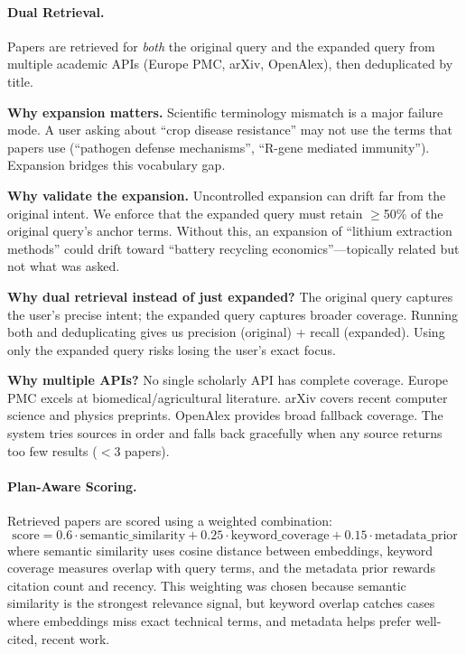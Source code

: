 \documentclass[11pt]{article}
\begin{document}
\paragraph{Dual Retrieval.} Papers are retrieved for \emph{both} the original query and the expanded query from multiple academic APIs (Europe PMC, arXiv, OpenAlex), then deduplicated by title.

\textbf{Why expansion matters.} Scientific terminology mismatch is a major failure mode. A user asking about ``crop disease resistance'' may not use the terms that papers use (``pathogen defense mechanisms'', ``R-gene mediated immunity''). Expansion bridges this vocabulary gap.

\textbf{Why validate the expansion.} Uncontrolled expansion can drift far from the original intent. We enforce that the expanded query must retain $\geq$50\% of the original query's anchor terms. Without this, an expansion of ``lithium extraction methods'' could drift toward ``battery recycling economics''---topically related but not what was asked.

\textbf{Why dual retrieval instead of just expanded?} The original query captures the user's precise intent; the expanded query captures broader coverage. Running both and deduplicating gives us precision (original) + recall (expanded). Using only the expanded query risks losing the user's exact focus.

\textbf{Why multiple APIs?} No single scholarly API has complete coverage. Europe PMC excels at biomedical/agricultural literature. arXiv covers recent computer science and physics preprints. OpenAlex provides broad fallback coverage. The system tries sources in order and falls back gracefully when any source returns too few results ($<$3 papers).

\paragraph{Plan-Aware Scoring.} Retrieved papers are scored using a weighted combination:
\[
\text{score} = 0.6 \cdot \text{semantic\_similarity} + 0.25 \cdot \text{keyword\_coverage} + 0.15 \cdot \text{metadata\_prior}
\]
where semantic similarity uses cosine distance between embeddings, keyword coverage measures overlap with query terms, and the metadata prior rewards citation count and recency. This weighting was chosen because semantic similarity is the strongest relevance signal, but keyword overlap catches cases where embeddings miss exact technical terms, and metadata helps prefer well-cited, recent work.
\end{document}
